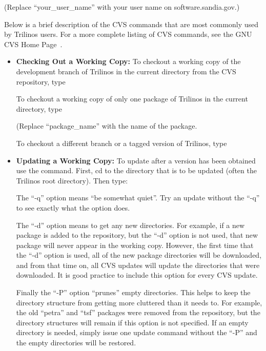 \documentclass[12pt,relax]{TrilinosUserGuide}
\begin{document}

(Replace ``your\_user\_name'' with your user name on software.sandia.gov.)

Below is a brief description of the CVS commands that are most commonly 
used by Trilinos users.  For a 
more complete listing of CVS commands, see the GNU CVS Home Page~\cite{CVS}.

\begin{itemize}
\item {\bf Checking Out a Working Copy:}
To checkout a working copy of the development branch of Trilinos in the 
current directory from the CVS repository, type


To checkout a working copy of only one package of Trilinos in the 
current directory, type


(Replace ``package\_name'' with the name of the package.

To checkout a different branch or a tagged version of Trilinos, type


\item {\bf Updating a Working Copy:}
To update after a version has been obtained use the  
command.  First, cd to the directory that is to be updated (often the 
Trilinos root directory).  Then type:


The ``-q'' option means ``be somewhat quiet''.  Try an update without the 
``-q'' to see exactly what the option does.  

The ``-d'' option means to get any new directories.  For example, if a new 
package is added to the repository, but the ``-d'' option is not used, that 
new package will never appear in the working copy.  However, the first time 
that the ``-d'' option is used, all of the new package directories will be 
downloaded, and from that time on, all CVS updates will update the 
directories that were downloaded.  It is good practice to include this 
option for every CVS update.

Finally the ``-P'' option ``prunes'' empty directories.  This helps to keep 
the directory structure from getting more cluttered than it needs to.  For 
example, the old ``petra'' and ``tsf'' packages were removed from the 
repository, but the directory structures will remain if this option is not 
specified.  If an empty directory is needed, simply issue one update 
command without the ``-P'' and the empty directories will be restored.


\end{itemize}

\end{document}
